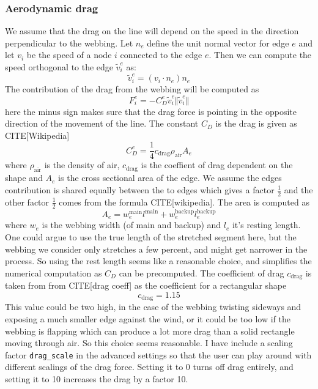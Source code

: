 \documentclass[a4paper,10pt]{article}
\newcommand{\tv}{\tilde{v}}
\begin{document}
\subsubsection{Aerodynamic drag}%
\label{ssub:Aerodynamic drag}
%
We assume that the drag on the line will depend on the speed in the direction perpendicular to the webbing. Let $n_e$ define the unit normal vector for edge $e$ and let $v_i$ be the speed of a node $i$ connected to the edge $e$. Then we can compute the speed orthogonal to the edge $\tv^e_i$ as:
%
\begin{equation}
   \tv^e_i = (v_i \cdot n_e) n_e
\end{equation}
%
The contribution of the drag from the webbing will be computed as
%
\begin{equation}
   F^e_i = - C_D^e \tv^e_i \Vert \tv^e_i \Vert
\end{equation}
%
here the minus sign makes sure that the drag force is pointing in the opposite direction of the movement of the line. The constant $C_D$ is the drag is given as CITE[Wikipedia]
%
\begin{equation}
   C_D^e = \frac{1}{4} c_\text{drag} \rho_\text{air} A_e
\end{equation}
%
where $\rho_\text{air}$ is the density of air, $c_\text{drag}$ is the coeffient of drag dependent on the shape and $A_e$ is the cross sectional area of the edge. We assume the edges contribution is shared equally between the to edges which gives a factor $\frac{1}{2}$ and the other factor $\frac{1}{2}$ comes from the formula CITE[wikipedia]. The area is computed as
%
\begin{equation}
   A_e = w^\text{main}_e l^\text{main} + w^\text{backup}_e l^\text{backup}_e
\end{equation}
%
where $w_e$ is the webbing width (of main and backup) and $l_e$ it's resting length. One could argue to use the true length of the stretched segment here, but the webbing we consider only stretches a few percent, and might get narrower in the process. So using the rest length seems like a reasonable choice, and simplifies the numerical computation as $C_D$ can be precomputed.
%
The coefficient of drag $c_\text{drag}$ is taken from from CITE[drag coeff] as the coefficient for a rectangular shape
%
\begin{equation}
   c_\text{drag} = 1.15
\end{equation}
% 
This value could be two high, in the case of the webbing twisting sideways and exposing a much smaller edge against the wind, or it could be too low if the webbing is flapping which can produce a lot more drag than a solid rectangle moving through air. So this choice seems reasonable. I have include a scaling factor \texttt{drag\_scale} in the advanced settings so that the user can play around with different scalings of the drag force. Setting it to 0 turns off drag entirely, and setting it to 10 increases the drag by a factor 10.
\end{document}
